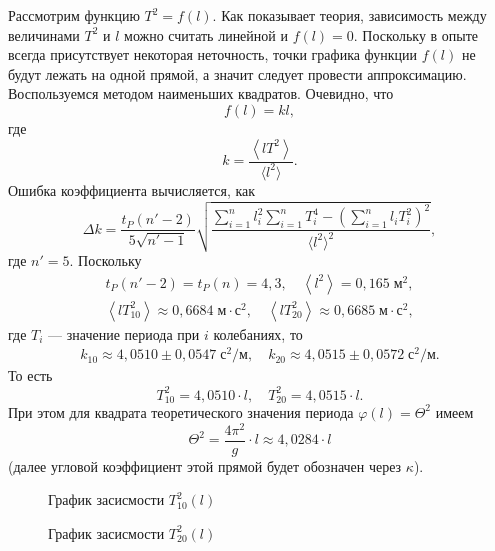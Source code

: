 Рассмотрим функцию $T^2=f(l)$. Как показывает теория, зависимость между величинами $T^2$ и $l$ можно считать линейной и $f(l)=0$. Поскольку в опыте всегда присутствует некоторая неточность, точки графика функции $f(l)$ не будут лежать на одной прямой, а значит следует провести аппроксимацию. Воспользуемся методом наименьших квадратов. Очевидно, что
\[
f(l)=kl,
\]
где
\[
k=\frac{\left\langle lT^2\right\rangle}{\langle l^2\rangle}.
\]
Ошибка коэффициента вычисляется, как
\[
\Delta k=\frac{t_P(n'-2)}{5\sqrt{n'-1}}\sqrt{\frac{\sum\limits_{i=1}^nl_i^2\sum\limits_{i=1}^nT_i^4-\left(\sum\limits_{i=1}^nl_iT_i^2\right)^2}{\langle l^2\rangle^2}},
\]
где $n'=5$.
Поскольку
\begin{gather*}
t_P(n'-2)=t_P(n)=4{,}3,\quad\left\langle l^2\right\rangle=0{,}165\;\text{м}^2, \\
\left\langle lT_{10}^2\right\rangle\approx0{,}6684\;\text{м}\cdot\text{с}^2,\quad\left\langle lT_{20}^2\right\rangle\approx0{,}6685\;\text{м}\cdot\text{с}^2,
\end{gather*}
где $T_i$ --- значение периода при $i$ колебаниях, то
\begin{gather*}
k_{10}\approx4{,}0510\pm0{,}0547\;\text{с$^2$/м},\quad k_{20}\approx4{,}0515\pm0{,}0572\;\text{с$^2$/м}.
\end{gather*}
То есть
\[
T_{10}^2=4{,}0510\cdot l,\quad T_{20}^2=4{,}0515\cdot l.
\]
При этом для квадрата теоретического значения периода $\varphi(l)=\Theta^2$ имеем
\[
\Theta^2=\frac{4\pi^2}{g}\cdot l\approx4{,}0284\cdot l
\]
(далее угловой коэффициент этой прямой будет обозначен через $\kappa$).

	
\begin{figure}[h!]
	\centering
	\caption{График засисмости $T_{10}^2(l)$}
\end{figure}

\begin{figure}[h!]
	\centering
	\caption{График засисмости $T_{20}^2(l)$}
\end{figure}

